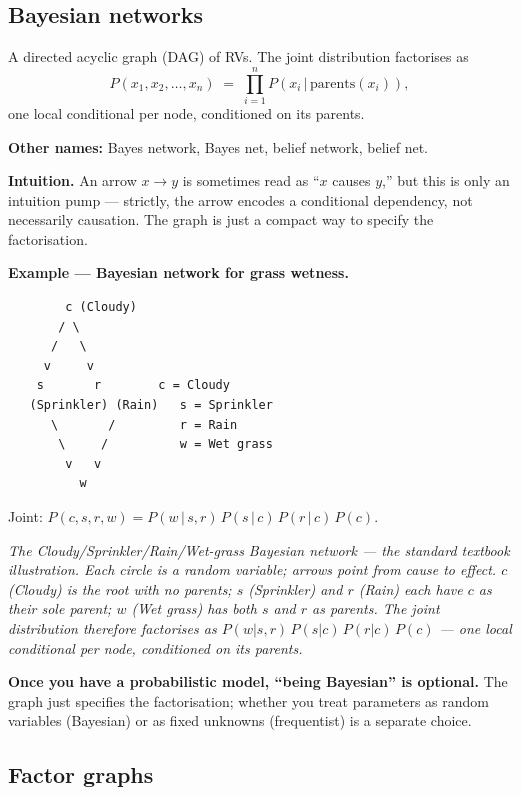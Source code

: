 \documentclass[11pt, a4paper]{article}
\begin{document}
\subsection{Bayesian networks}

\begin{defbox}
A directed acyclic graph (DAG) of RVs. The joint distribution factorises as
\[
P(x_1, x_2, \ldots, x_n) \;=\; \prod_{i=1}^n P(x_i \,|\, \text{parents}(x_i)),
\]
one local conditional per node, conditioned on its parents.
\end{defbox}

\textbf{Other names:} Bayes network, Bayes net, belief network, belief net.

\textbf{Intuition.} An arrow $x \to y$ is sometimes read as ``$x$ causes $y$,'' but this is only an intuition pump — strictly, the arrow encodes a conditional dependency, not necessarily causation. The graph is just a compact way to specify the factorisation.

\textbf{Example — Bayesian network for grass wetness.}

\begin{verbatim}
        c (Cloudy)
       / \
      /   \
     v     v
    s       r        c = Cloudy
   (Sprinkler) (Rain)   s = Sprinkler
      \       /         r = Rain
       \     /          w = Wet grass
        v   v
          w
\end{verbatim}

Joint: $P(c,s,r,w) = P(w\,|\,s,r)\,P(s\,|\,c)\,P(r\,|\,c)\,P(c)$.

\begin{center}

\footnotesize\textit{The Cloudy/Sprinkler/Rain/Wet-grass Bayesian network --- the standard textbook illustration. Each circle is a random variable; arrows point from cause to effect. $c$ (Cloudy) is the root with no parents; $s$ (Sprinkler) and $r$ (Rain) each have $c$ as their sole parent; $w$ (Wet grass) has both $s$ and $r$ as parents. The joint distribution therefore factorises as $P(w|s,r)\,P(s|c)\,P(r|c)\,P(c)$ --- one local conditional per node, conditioned on its parents.}
\end{center}

\textbf{Once you have a probabilistic model, ``being Bayesian'' is optional.} The graph just specifies the factorisation; whether you treat parameters as random variables (Bayesian) or as fixed unknowns (frequentist) is a separate choice.

\subsection{Factor graphs}
\end{document}
